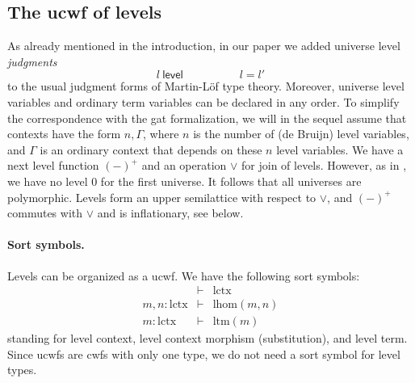 \documentclass[submission,copyright,creativecommons]{eptcs}
\newcommand{\level}{\mathsf{level}}
\def\lHom{\mathrm{lhom}}
\def\lctx{\mathrm{lctx}}
\def\ltm{\mathrm{ltm}}
\begin{document}
\subsection{The ucwf of levels}\label{ucwf-levels}
As already mentioned in the introduction, in our paper \cite{BezemCDE22} we added universe level {\em judgments}
$$
l\ \level
\hspace{5em}
l = l'
$$
to the usual judgment forms of Martin-Löf type theory. Moreover, universe level variables and ordinary term variables can be declared in any order. To simplify the correspondence with the gat formalization, we will in the sequel assume that contexts have the form $n, \Gamma$, where $n$ is the number of (de Bruijn) level variables, and $\Gamma$ is an ordinary context that depends on these $n$ level variables.
We have a next level function $(-)^+$ and an operation $\vee$ for join of levels. However, as in \cite[Section 3,4]{BezemCDE22}, we have no level 0 for the first universe. It follows that all universes are polymorphic.
Levels form an upper semilattice with respect to $\vee$, and $(-)^+$ commutes
with $\vee$ and is inflationary, see below.

\paragraph{Sort symbols.} Levels can be organized as a ucwf. We have the following sort symbols:
\begin{eqnarray*}
&\vdash& \lctx\\
m, n : \lctx &\vdash& \lHom(m,n)\\
m : \lctx &\vdash& \ltm(m)
\end{eqnarray*}
standing for level context, level context morphism (substitution), and level term.
Since ucwfs are cwfs with only one type, we do not need a sort symbol for level types.
\end{document}
